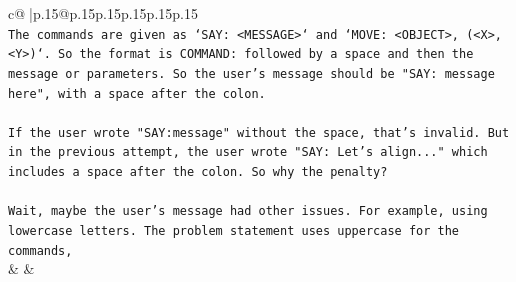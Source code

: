 \documentclass{article}
\begin{document}
{\begin{supertabular}{c@{$\;$}|p{.15\linewidth}@{}p{.15\linewidth}p{.15\linewidth}p{.15\linewidth}p{.15\linewidth}p{.15\linewidth}}
{{{\\ 
\texttt{The commands are given as `SAY: <MESSAGE>` and `MOVE: <OBJECT>, (<X>, <Y>)`. So the format is COMMAND: followed by a space and then the message or parameters. So the user's message should be "SAY: message here", with a space after the colon.} \\
\\ 
\texttt{If the user wrote "SAY:message" without the space, that's invalid. But in the previous attempt, the user wrote "SAY: Let's align..." which includes a space after the colon. So why the penalty?} \\
\\ 
\texttt{Wait, maybe the user's message had other issues. For example, using lowercase letters. The problem statement uses uppercase for the commands,} \\
            }
        }
    }
    & & \\ \\


\end{supertabular}}
\end{document}
